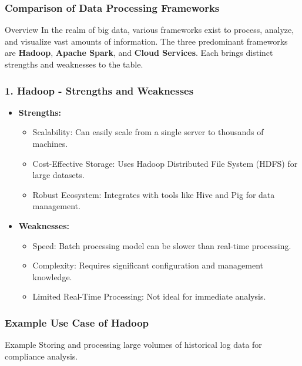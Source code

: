 \documentclass[aspectratio=169]{beamer}
\begin{document}
\begin{frame}[fragile]
    \frametitle{Comparison of Data Processing Frameworks}
    \begin{block}{Overview}
        In the realm of big data, various frameworks exist to process, analyze, and visualize vast amounts of information. The three predominant frameworks are \textbf{Hadoop}, \textbf{Apache Spark}, and \textbf{Cloud Services}. Each brings distinct strengths and weaknesses to the table.
    \end{block}
\end{frame}

\begin{frame}[fragile]
    \frametitle{1. Hadoop - Strengths and Weaknesses}
    \begin{itemize}
        \item \textbf{Strengths:}
        \begin{itemize}
            \item Scalability: Can easily scale from a single server to thousands of machines.
            \item Cost-Effective Storage: Uses Hadoop Distributed File System (HDFS) for large datasets.
            \item Robust Ecosystem: Integrates with tools like Hive and Pig for data management.
        \end{itemize}
        \item \textbf{Weaknesses:}
        \begin{itemize}
            \item Speed: Batch processing model can be slower than real-time processing.
            \item Complexity: Requires significant configuration and management knowledge.
            \item Limited Real-Time Processing: Not ideal for immediate analysis.
        \end{itemize}
    \end{itemize}
\end{frame}

\begin{frame}[fragile]
    \frametitle{Example Use Case of Hadoop}
    \begin{block}{Example}
        Storing and processing large volumes of historical log data for compliance analysis.
    \end{block}
\end{frame}
\end{document}
